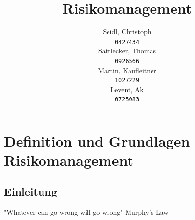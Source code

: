 \documentclass{report}
\begin{document}
\pagestyle{plain}

\title{Risikomanagement}


\author{
  Seidl, Christoph\\
  \texttt{0427434}
  \\[3ex]
  Sattlecker, Thomas\\
  \texttt{0926566}
\\[3ex]
  Martin, Kaufleitner\\
  \texttt{1027229}
\\[3ex]
  Levent, Ak\\
  \texttt{0725083}
}

%


\maketitle

\tableofcontents
\newpage


\chapter{Definition und Grundlagen Risikomanagement}
\section{Einleitung}

\begin{center}
"Whatever can go wrong will go wrong" Murphy's Law\cite{WikiM}
\end{center}
\end{document}
